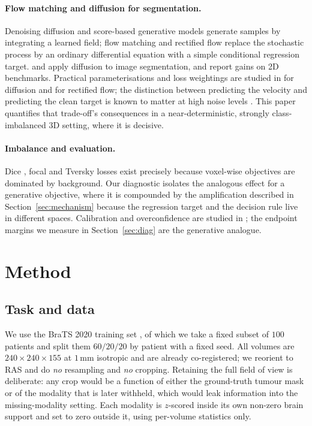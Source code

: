 \documentclass[conference]{IEEEtran}
\begin{document}
\paragraph{Flow matching and diffusion for segmentation.}
Denoising diffusion \cite{ho2020ddpm} and score-based generative models
\cite{song2021score} generate samples by integrating a learned field; flow
matching \cite{lipman2023flow} and rectified flow \cite{liu2023flow}
replace the stochastic process by an ordinary differential equation with a
simple conditional regression target. \cite{amit2021segdiff} and
\cite{wu2023medsegdiff} apply diffusion to image segmentation, and report gains
on 2D benchmarks. Practical parameterisations and loss weightings are studied
in \cite{karras2022edm} for diffusion and \cite{esser2024scaling} for rectified
flow; the distinction between predicting the velocity and predicting the clean
target is known to matter at high noise levels \cite{salimans2022progressive}.
This paper quantifies that trade-off's consequences in a near-deterministic,
strongly class-imbalanced 3D setting, where it is decisive.

\paragraph{Imbalance and evaluation.}
Dice \cite{milletari2016vnet}, focal \cite{lin2017focal} and Tversky
\cite{salehi2017tversky} losses exist precisely because voxel-wise objectives
are dominated by background. Our diagnostic isolates the analogous effect for a
generative objective, where it is compounded by the amplification described in
Section~\ref{sec:mechanism} because the regression target and the decision
rule live in different spaces. Calibration and overconfidence are studied in
\cite{guo2017calibration}; the endpoint margins we measure in
Section~\ref{sec:diag} are the generative analogue.

\section{Method}
\label{sec:method}

\subsection{Task and data}

We use the BraTS 2020 training set \cite{menze2015brats, bakas2017advancing, bakas2018identifying}, of
which we take a fixed subset of $100$ patients and split them $60/20/20$ by
patient with a fixed seed. All volumes are $240\times240\times155$ at $1$\,mm
isotropic and are already co-registered; we reorient to RAS and do
\emph{no} resampling and \emph{no} cropping. Retaining the full field of view is
deliberate: any crop would be a function of either the ground-truth tumour mask
or of the modality that is later withheld, which would leak information into
the missing-modality setting. Each modality is $z$-scored inside its own
non-zero brain support and set to zero outside it, using per-volume statistics
only.
\end{document}
